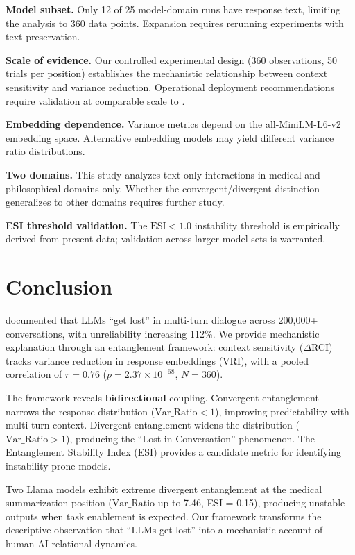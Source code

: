 \documentclass[twoside,11pt]{article}
\begin{document}
\textbf{Model subset.} Only 12 of 25 model-domain runs have response text, limiting the analysis to 360 data points. Expansion requires rerunning experiments with text preservation.

\textbf{Scale of evidence.} Our controlled experimental design (360 observations, 50 trials per position) establishes the mechanistic relationship between context sensitivity and variance reduction. Operational deployment recommendations require validation at comparable scale to \citet{laban2025lost}.

\textbf{Embedding dependence.} Variance metrics depend on the all-MiniLM-L6-v2 embedding space. Alternative embedding models may yield different variance ratio distributions.

\textbf{Two domains.} This study analyzes text-only interactions in medical and philosophical domains only. Whether the convergent/divergent distinction generalizes to other domains requires further study.

\textbf{ESI threshold validation.} The $\text{ESI} < 1.0$ instability threshold is empirically derived from present data; validation across larger model sets is warranted.

\section{Conclusion}

\citet{laban2025lost} documented that LLMs ``get lost'' in multi-turn dialogue across 200,000+ conversations, with unreliability increasing 112\%. We provide mechanistic explanation through an entanglement framework: context sensitivity ($\Delta$RCI) tracks variance reduction in response embeddings (VRI), with a pooled correlation of $r = 0.76$ ($p = 2.37 \times 10^{-68}$, $N = 360$).

The framework reveals \textbf{bidirectional} coupling. Convergent entanglement narrows the response distribution ($\text{Var\_Ratio} < 1$), improving predictability with multi-turn context. Divergent entanglement widens the distribution ($\text{Var\_Ratio} > 1$), producing the ``Lost in Conversation'' phenomenon. The Entanglement Stability Index (ESI) provides a candidate metric for identifying instability-prone models.

Two Llama models exhibit extreme divergent entanglement at the medical summarization position ($\text{Var\_Ratio}$ up to 7.46, ESI = 0.15), producing unstable outputs when task enablement is expected. Our framework transforms the descriptive observation that ``LLMs get lost'' into a mechanistic account of human-AI relational dynamics.
\end{document}
